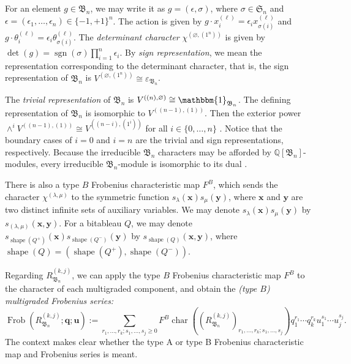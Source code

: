 \documentclass[12pt]{amsart}
\theoremstyle{plain}
\theoremstyle{definition}
\DeclareMathOperator{\shape}{shape}
\DeclareMathOperator{\Frob}{Frob}
\DeclareMathOperator{\sgn}{sgn}
\DeclareMathOperator{\ch}{char}
\newcommand{\x}{\mathbf{x}}
\newcommand{\y}{\mathbf{y}}
\begin{document}
For an element $g \in \mathfrak{B}_n$, we may write it as $g = (\epsilon, \sigma)$, where $\sigma \in \mathfrak{S}_n$ and $\epsilon = (\epsilon_1,\ldots,\epsilon_n) \in \{-1,+1\}^n$. 
The action is given by $g \cdot x_i^{(\ell)} = \epsilon_i x_{\sigma (i)}^{(\ell)}$ and $g \cdot \theta_i^{(\ell)} = \epsilon_i \theta_{\sigma (i)}^{(\ell)}$.
The \emph{determinant character} $\chi^{(\varnothing, (1^n))}$ is given by  $\det(g) = \sgn(\sigma) \prod_{i=1}^n \epsilon_i$.
By \emph{sign representation}, we mean the representation corresponding to the determinant character, that is, the sign representation of $\mathfrak{B}_n$ is $V^{(\varnothing, (1^n))} \cong \varepsilon_{\mathfrak{B}_n}$. 

The \emph{trivial representation} of $\mathfrak{B}_n$ is $V^{((n),\varnothing)} \cong \mathbbm{1}_{\mathfrak{B}_n}$. 
The defining representation of $\mathfrak{B}_n$ is isomorphic to $V^{((n-1),(1))}$. 
Then the exterior power $\wedge^i V^{((n-1),(1))} \cong V^{((n-i),(1^i))}$ for all $i \in \{0,\ldots, n\}$ \cite[Proposition 5.5.7]{GeckPfeiffer}. 
Notice that the boundary cases of $i=0$ and $i=n$ are the trivial and sign representations, respectively.
Because the irreducible $\mathfrak{B}_n$ characters may be afforded by $\mathbb{Q}[\mathfrak{B}_n]$-modules, every irreducible $\mathfrak{B}_n$-module is isomorphic to its dual \cite[Theorem 5.5.6]{GeckPfeiffer}.

There is also a type $B$ Frobenius characteristic map $F^B$, which sends the character $\chi^{(\lambda, \mu)}$ to the symmetric function $s_\lambda(\x)s_\mu(\y)$, where $\x$ and $\y$ are two distinct infinite sets of auxiliary variables.
We may denote $s_{\lambda}(\x) s_{\mu}(\y)$ by $s_{(\lambda,\mu)}(\x,\y)$. 
For a bitableau $Q$, we may denote $s_{\shape(Q^+)}(\x)s_{\shape(Q^-)}(\y)$ by $s_{\shape(Q)} (\x,\y)$, where $\shape(Q) = (\shape(Q^+), \shape(Q^-))$.

Regarding $R_{\mathfrak{B}_n}^{(k,j)}$, we can apply the type $B$ Frobenius characteristic map $F^B$ to the character of each multigraded component, and obtain the \emph{(type $B$) multigraded Frobenius series:} 
\begin{equation} \Frob(R_{\mathfrak{B}_n}^{(k,j)}; \mathbf{q}; \mathbf{u}) := \sum_{r_1,\ldots,r_k; s_1, \ldots, s_j \geq 0} F^B\ch\left((R_{\mathfrak{B}_n}^{(k,j)})_{r_1,\ldots,r_k; s_1, \ldots, s_j} \right)q_1^{r_1} \cdots q_k^{r_k}u_1^{s_1} \cdots u_j^{s_j}.\end{equation}
The context makes clear whether the type A or type B Frobenius characteristic map and Frobenius series is meant.
\end{document}
